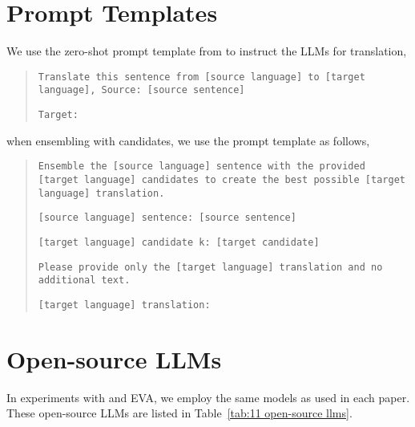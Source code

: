 \section{Prompt Templates}
\label{sec:apdx_prompt_templates}

We use the zero-shot prompt template from \citet{howgood} to instruct the LLMs for translation,

\begin{quote}

    \small
    \texttt{Translate this sentence from [source language] to [target language], Source: [source sentence]}

    \texttt{Target:}
\end{quote}

when ensembling with candidates, we use the prompt template as follows,

\begin{quote}
    \small
    \texttt{Ensemble the [source language] sentence with the provided [target language] candidates to create the best possible [target language] translation.}
    
    \texttt{[source language] sentence: [source sentence]}
    
    \texttt{[target language] candidate k: [target candidate]}
    
    \texttt{Please provide only the [target language] translation and no additional text.}
    
    \texttt{[target language] translation:}
\end{quote}

\section{Open-source LLMs}
\label{sec:apdx_llms}
In experiments with \blender and EVA, we employ the same models as used in each paper.
These open-source LLMs are listed in Table~\ref{tab:11 open-source llms}.

